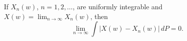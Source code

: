 If $X_n(w)$, $n = 1, 2, \ldots$, are uniformly integrable and $X(w) = \lim_{n \to \infty} X_n(w)$, then
$$\lim_{n \to \infty} \int |X(w) - X_n(w)| \, dP = 0.$$
